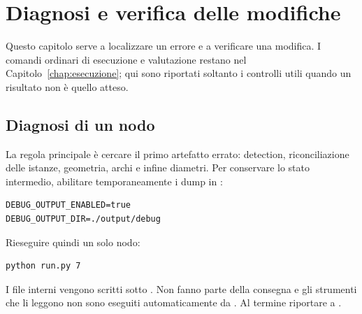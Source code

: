 \chapter{Diagnosi e verifica delle modifiche}
\label{chap:debug}

Questo capitolo serve a localizzare un errore e a verificare una modifica. I
comandi ordinari di esecuzione e valutazione restano nel
Capitolo~\ref{chap:esecuzione}; qui sono riportati soltanto i controlli utili
quando un risultato non è quello atteso.

\section{Diagnosi di un nodo}

La regola principale è cercare il primo artefatto errato: detection,
riconciliazione delle istanze, geometria, archi e infine diametri. Per conservare
lo stato intermedio, abilitare temporaneamente i dump in :

\begin{lstlisting}[language={}]
DEBUG_OUTPUT_ENABLED=true
DEBUG_OUTPUT_DIR=./output/debug
\end{lstlisting}

Rieseguire quindi un solo nodo:

\begin{lstlisting}[language={}]
python run.py 7
\end{lstlisting}

I file interni vengono scritti sotto
. Non fanno parte della consegna e gli
strumenti che li leggono non sono eseguiti automaticamente da
. Al termine riportare  a
.

